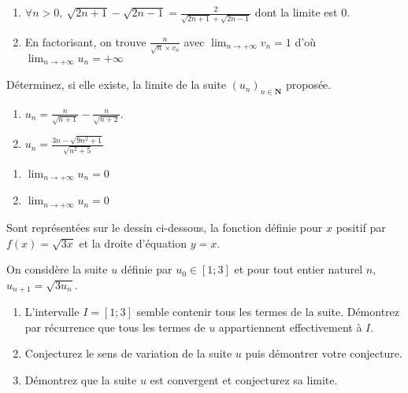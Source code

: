 \documentclass[a4paper,12pt,french]{article}
\newcommand{\N}{\mathbf{N}}
\begin{document}
\begin{Answer}
  \begin{enumerate}[label=\alph*)]
      \item $\forall n>0 ,\ \sqrt{2n+1}-\sqrt{2n-1} = \frac{2}{
      \sqrt{2n+1}+\sqrt{2n-1}}$ dont la limite est 0.
    \item En factorisant, on trouve $\frac{n}{\sqrt{n}\times v_n}$ avec
      $\lim_{n\to+\infty}v_n=1$ d'où $\lim_{n\to+\infty}u_n=+\infty$
  \end{enumerate}
\end{Answer}

\begin{Exercise}
  Déterminez, si elle existe, la limite de la suite $(u_n)_{n\in\N}$
  proposée.
  \begin{enumerate}[label=\alph*)]
    \item $u_n = \frac{n}{\sqrt{n+1}} -\frac{n}{\sqrt{n+2}}$.
    \item $u_n = \frac{3n - \sqrt{9n^2 +1}}{\sqrt{n^2 + 5}}$
  \end{enumerate}
\end{Exercise}

\begin{Answer}
  \begin{enumerate}[label=\alph*)]
    \item $\lim_{n\to+\infty}u_n = 0$
    \item $\lim_{n\to+\infty}u_n = 0$
  \end{enumerate}
\end{Answer}

\begin{Exercise}[number=82]
  Sont représentées sur le dessin ci-dessous, la fonction définie pour
  $x$ positif par $f(x) = \sqrt{3x}$ et la droite d'équation $y=x$.

  On considère la suite $u$ définie par $u_0\in[1;3]$ et pour tout
  entier naturel $n$, $u_{n+1} = \sqrt{3u_n}$.

  \begin{enumerate}[label=\textbf{\arabic*.}]
    \item L'intervalle $I = [1;3]$ semble contenir tous les termes de la
      suite. Démontrez par récurrence que tous les termes de $u$
      appartiennent effectivement à $I$.
    \item Conjecturez le sens de variation de la suite $u$ puis démontrer
      votre conjecture.
    \item Démontrez que la suite $u$ est convergent et conjecturez sa
      limite.
  \end{enumerate}
\end{Exercise}
\end{document}
